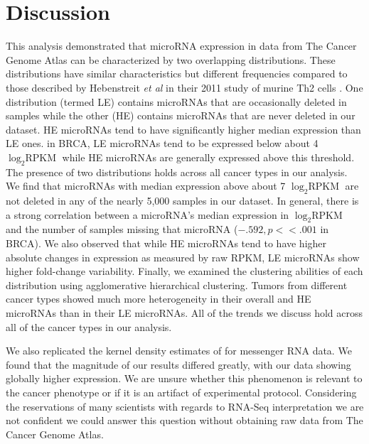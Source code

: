\documentclass[12pt]{report}
\begin{document}
\section*{Discussion}
  This analysis demonstrated that microRNA expression in data from The Cancer Genome Atlas can be
  characterized by two overlapping distributions. These distributions have similar characteristics but
  different frequencies compared to those described by Hebenstreit \emph{et al} in their 2011 study of
  murine Th2 cells \cite{Hebenstreit2011}. One distribution (termed LE) contains microRNAs that are occasionally deleted in samples 
  while the other (HE) contains microRNAs that are never deleted in our dataset. HE microRNAs tend to have significantly higher median
  expression than LE ones. in BRCA, LE microRNAs tend to be expressed below about 4 $\log_{2} \text{RPKM}$ 
  while HE microRNAs are generally expressed above this threshold. The presence of two distributions holds across
  all cancer types in our analysis. We find that microRNAs with 
  median expression above about 7 $\log_{2} \text{RPKM}$ are not deleted in any 
  of the nearly 5,000 samples in our dataset. In general, there is a strong 
 correlation between a microRNA's median expression in $\log_{2} \text{RPKM}$ and the 
 number of samples missing that microRNA ($-.592, p << .001$ in BRCA). We also 
 observed that while HE microRNAs tend to have higher absolute changes in 
 expression as measured by raw RPKM, LE microRNAs show higher fold-change variability.
 Finally, we examined the clustering abilities of each distribution using 
 agglomerative hierarchical clustering. Tumors from different cancer types showed much more heterogeneity in 
 their overall and HE microRNAs than in their LE microRNAs. All of the trends we 
 discuss hold across all of the cancer types in our analysis.
  
  We also replicated the kernel density estimates of \cite{Hebenstreit2011} for messenger RNA 
  data. We found that the
  magnitude of our results differed greatly, with our data showing globally higher expression.
   We are unsure whether this
  phenomenon is relevant to the cancer phenotype or if it is an artifact of
  experimental protocol. Considering the reservations of
  many scientists with regards to RNA-Seq interpretation \cite{Wagner2012} we are not confident
  we could answer this question without obtaining raw data from The Cancer Genome Atlas.
  
\end{document}
